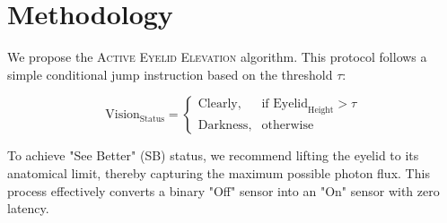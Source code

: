 \section{Methodology}
\label{sec:method}

We propose the \textsc{Active Eyelid Elevation} algorithm. This protocol follows a simple conditional jump instruction based on the threshold $\tau$:


\begin{equation}
    \text{Vision}_{\text{Status}} =
    \begin{cases}
      \text{Clearly}, & \text{if } \text{Eyelid}_{\text{Height}} > \tau \\
      \text{Darkness}, & \text{otherwise}
    \end{cases}
\end{equation}


To achieve "See Better" (SB) status, we recommend lifting the eyelid to its anatomical limit, thereby capturing the maximum possible photon flux. This process effectively converts a binary "Off" sensor into an "On" sensor with zero latency.
